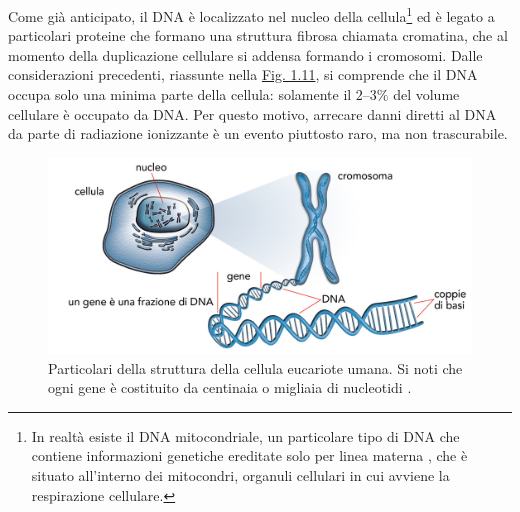\documentclass[12pt,a4paper,twoside]{report}
\begin{document}
	Come già anticipato, il DNA è localizzato nel nucleo della cellula\footnote{In realtà esiste il DNA mitocondriale, un particolare tipo di DNA che contiene informazioni genetiche ereditate solo per linea materna \cite{campbell2anno}, che è situato all'interno dei mitocondri, organuli cellulari in cui avviene la respirazione cellulare.} ed è legato a particolari proteine che formano una struttura fibrosa chiamata cromatina, che al momento della duplicazione cellulare si addensa formando i cromosomi. Dalle considerazioni precedenti, riassunte nella \hyperref[fig:cell]{Fig. 1.11}, si comprende che il DNA occupa solo una minima parte della cellula: solamente il $2$--$3\%$ del volume cellulare è occupato da DNA. Per questo motivo, arrecare danni diretti al DNA da parte di radiazione ionizzante è un evento piuttosto raro, ma non trascurabile.
	\begin{figure}[H]
		\centering
		\includegraphics[width=0.9\linewidth]{cell.jpg}
		\caption{Particolari della struttura della cellula eucariote umana. Si noti che ogni gene è costituito da centinaia o migliaia di nucleotidi \cite{dbook}.}
		\label{fig:cell}
	\end{figure}
\end{document}
